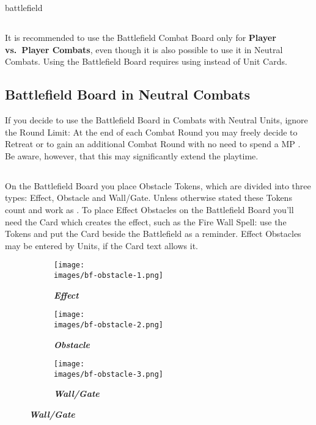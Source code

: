 \pagebreak
\begin{expansion}{battlefield}
  \begin{multicols*}{2}
  \subsection*{}
  It is recommended to use the Battlefield Combat Board only for \textbf{Player vs.~Player Combats}, even though it is also possible to use it in Neutral Combats.
  Using the Battlefield Board requires using  instead of Unit Cards.

  \medskip
  \subsection*{Battlefield Board in Neutral Combats}
  If you decide to use the Battlefield Board in Combats with Neutral Units, ignore the Round Limit:
  At the end of each Combat Round you may freely decide to Retreat or to gain an additional Combat Round with no need to spend a MP .
  Be aware, however, that this may significantly extend the playtime.

  \medskip
  \subsection*{}
  On the Battlefield Board you place Obstacle Tokens, which are divided into three types:
  Effect, Obstacle and Wall/Gate.
  Unless otherwise stated these Tokens count and work as .
  To place Effect Obstacles on the Battlefield Board you'll need the Card which creates the effect, such as the Fire Wall Spell: use the Tokens and put the Card beside the Battlefield as a reminder.
  Effect Obstacles may be entered by Units, if the Card text allows it.
  \vspace*{1em}
  \begin{figure}[H]
    \centering
    \begin{subfigure}[b]{0.3\linewidth}
      \centering
      \texttt{[image: \\images/bf-obstacle-1.png]}
      \caption{\textbf{\textit{\textcolor{darkcandyapplered}{Effect}}}}
    \end{subfigure}
    \begin{subfigure}[b]{0.3\linewidth}
      \centering
      \texttt{[image: \\images/bf-obstacle-2.png]}
      \caption{\textbf{\textit{\textcolor{darkcandyapplered}{Obstacle}}}}
    \end{subfigure}
    \begin{subfigure}[b]{0.3\linewidth}
      \centering
      \texttt{[image: \\images/bf-obstacle-3.png]}
      \caption{\textbf{\textit{\textcolor{darkcandyapplered}{Wall/Gate}}}}
    \end{subfigure}
  \end{figure}
  \vspace*{1em}
  \columnbreak


\end{multicols*}
\end{expansion}
